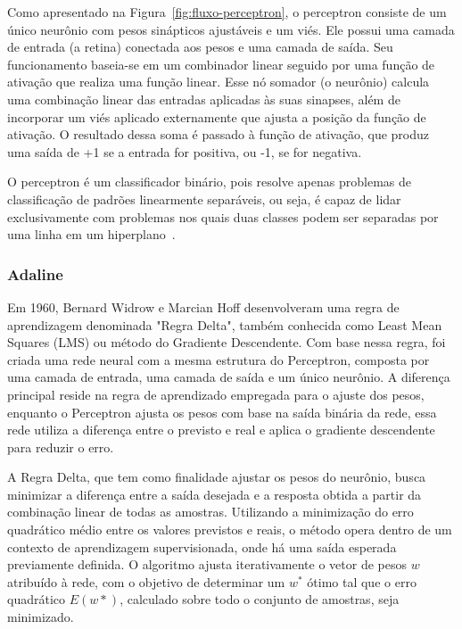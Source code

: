             Como apresentado na Figura~\ref{fig:fluxo-perceptron}, o perceptron consiste de um único neurônio com 
            pesos sinápticos ajustáveis e um viés. Ele possui uma camada de entrada (a retina) conectada aos pesos e 
            uma camada de saída. Seu funcionamento baseia-se em um combinador linear seguido por uma função de 
            ativação que realiza uma função linear. Esse nó somador (o neurônio) calcula uma combinação linear das 
            entradas aplicadas às suas sinapses, além de incorporar um viés aplicado externamente que ajusta a posição
            da função de ativação. O resultado dessa soma é passado à função de ativação, que produz uma saída de +1 
            se a entrada for positiva, ou -1, se for negativa. 
            
            O perceptron é um classificador binário, pois resolve apenas problemas de classificação de padrões 
            linearmente separáveis, ou seja, é capaz de lidar exclusivamente com problemas nos quais duas classes 
            podem ser separadas por uma linha em um hiperplano~\cite{haykin2009neural}. 


        \subsubsection{Adaline}

            Em 1960, Bernard Widrow e Marcian Hoff desenvolveram uma regra de aprendizagem denominada "Regra Delta", 
            também conhecida como Least Mean Squares (LMS) ou método do Gradiente Descendente. Com base nessa regra, 
            foi criada uma rede neural com a mesma estrutura do Perceptron, composta por uma camada de entrada, uma 
            camada de saída e um único neurônio. A diferença principal reside na regra de aprendizado empregada para 
            o ajuste dos pesos, enquanto o Perceptron ajusta os pesos com base na saída binária da rede, essa rede
            utiliza a diferença entre o previsto e real e aplica o gradiente descendente para reduzir o erro.
            
            A Regra Delta, que tem como finalidade ajustar os pesos do neurônio, busca minimizar a diferença entre a 
            saída desejada e a resposta obtida a partir da combinação linear de todas as amostras. Utilizando a 
            minimização do erro quadrático médio entre os valores previstos e reais, o método opera dentro de um 
            contexto de aprendizagem supervisionada, onde há uma saída esperada previamente definida. O algoritmo 
            ajusta iterativamente o vetor de pesos \( w\) atribuído à rede, com o objetivo de determinar um 
            \( w^{*} \) ótimo tal que o erro quadrático \({E(w{*})}\), calculado sobre todo o conjunto de amostras, 
            seja minimizado.

